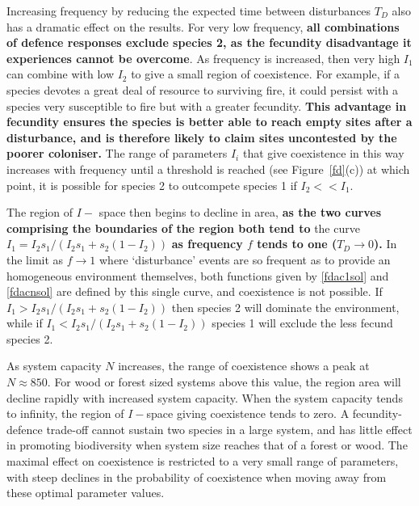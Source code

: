 Increasing frequency by reducing the expected time between disturbances $T_D$ also has a dramatic effect on the results. For very low frequency, \textbf{all combinations of defence responses exclude species 2, as the fecundity disadvantage it experiences cannot be overcome}. As frequency is increased, then very high $I_1$ can combine with low $I_2$ to give a small region of coexistence. For example, if a species devotes a great deal of resource to surviving fire, it could persist with a species very susceptible to fire but with a greater fecundity. \textbf{This advantage in fecundity ensures the species is better able to reach empty sites after a disturbance, and is therefore likely to claim sites uncontested by the poorer coloniser.} The range of parameters $I_i$ that give coexistence in this way increases with frequency until a threshold is reached (see Figure~\ref{fd}(c)) at which point, it is possible for species 2 to outcompete species 1 if $I_2<<I_1$.

The region of $I-$ space then begins to decline in area, \textbf{as the two curves comprising the boundaries of the region both tend to} the curve $I_1=I_2s_1/(I_2s_1+s_2(1-I_2))$ \textbf{as frequency $f$ tends to one ($T_D \to 0$).} In the limit as $f \to 1$ where `disturbance' events are so frequent as to provide an homogeneous environment themselves, both functions given by \eqref{fdac1sol} and \eqref{fdacnsol} are defined by this single curve, and coexistence is not possible. If $I_1>I_2s_1/(I_2s_1+s_2(1-I_2))$ then species 2 will dominate the environment, while if $I_1<I_2s_1/(I_2s_1+s_2(1-I_2))$ species 1 will exclude the less fecund species 2.

As system capacity $N$ increases, the range of coexistence shows a peak at $N \approx 850$. For wood or forest sized systems above this value, the region area will decline rapidly with increased system capacity. When the system capacity tends to infinity, the region of $I-$space giving coexistence tends to zero. A fecundity-defence trade-off cannot sustain two species in a large system, and has little effect in promoting biodiversity when system size reaches that of a forest or wood. The maximal effect on coexistence is restricted to a very small range of parameters, with steep declines in the probability of coexistence when moving away from these optimal parameter values. 

